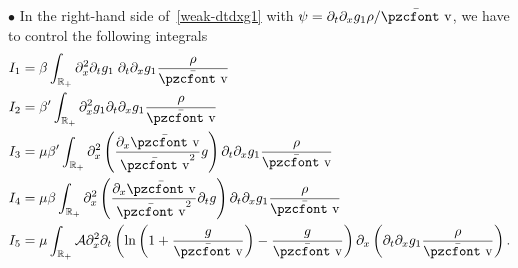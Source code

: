 \documentclass[10pt]{amsart}
\theoremstyle{definition}\newtheorem{defi}[theo]{Definition}\newtheorem{rema}[theo]{Remark}\newtheorem{exam}[theo]{Example}\newtheorem{exem}[theo]{Example}\newtheorem{nota}[theo]{Notation}
\newcommand{\mathpzc}[1]{\text{\pzcfont #1}}
\newcommand{\R}{\mathbb{R}}
\newcommand{\p}{\partial}
\newcommand{\bv}{\bar{\mathpzc{v}}}
\newcommand{\cA}{\mathcal A}
\begin{document}
$\bullet$ In the right-hand side of~\eqref{weak-dtdxg1} with $\psi=\p_t\p_x g_1 \rho/\bv$, we have to control the following integrals
\begin{align*}
I_1 & = \beta \int_{\R_+} \partial_x^2 \partial_t g_1 \; \partial_t \partial_x g_1 \dfrac{\rho}{\bv} \\
I_2 & = \beta' \int_{\R_+} \partial^2_x g_1 \partial_t \partial_x g_1 \dfrac{\rho}{\bv} \\
I_3 & = \mu \beta' \int_{\R_+} \partial^2_x \left(\dfrac{\partial_x \bv}{\bv^2} g\right) \partial_t \partial_x g_1 \dfrac{\rho}{\bv} \\
I_4 & = \mu \beta \int_{\R_+} \partial^2_x \left(\dfrac{\partial_x \bv}{\bv^2} \partial_t g\right) \partial_t \partial_x g_1 \dfrac{\rho}{\bv} \\
I_5 & = \mu \int_{\R_+} \cA \partial^2_x \partial_t \left(\ln \left(1 + \frac{g}{\bv}\right) - \frac{g}{\bv}\right)\p_x\left(\partial_t \partial_x g_1 \dfrac{\rho}{\bv}\right).
\end{align*}
\end{document}
